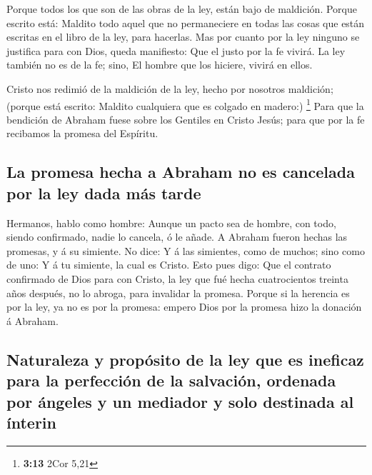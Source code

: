  Porque todos los que son de las obras de la ley, están
bajo de maldición. Porque escrito está: Maldito todo aquel que no
permaneciere en todas las cosas que están escritas en el libro de la
ley, para hacerlas.  Mas por cuanto por la ley ninguno se
justifica para con Dios, queda manifiesto: Que el justo por la fe
vivirá.  La ley también no es de la fe; sino, El hombre que
los hiciere, vivirá en ellos.

 Cristo nos redimió de la maldición de la ley, hecho por
nosotros maldición; (porque está escrito: Maldito cualquiera que es
colgado en madero:) \footnote{\textbf{3:13} 2Cor 5,21} 
Para que la bendición de Abraham fuese sobre los Gentiles en Cristo
Jesús; para que por la fe recibamos la promesa del Espíritu.

\hypertarget{la-promesa-hecha-a-abraham-no-es-cancelada-por-la-ley-dada-muxe1s-tarde}{%
\subsection{La promesa hecha a Abraham no es cancelada por la ley dada
más
tarde}\label{la-promesa-hecha-a-abraham-no-es-cancelada-por-la-ley-dada-muxe1s-tarde}}

 Hermanos, hablo como hombre: Aunque un pacto sea de
hombre, con todo, siendo confirmado, nadie lo cancela, ó le añade.
 A Abraham fueron hechas las promesas, y á su simiente. No
dice: Y á las simientes, como de muchos; sino como de uno: Y á tu
simiente, la cual es Cristo.  Esto pues digo: Que el
contrato confirmado de Dios para con Cristo, la ley que fué hecha
cuatrocientos treinta años después, no lo abroga, para invalidar la
promesa.  Porque si la herencia es por la ley, ya no es por
la promesa: empero Dios por la promesa hizo la donación á Abraham.

\hypertarget{naturaleza-y-propuxf3sito-de-la-ley-que-es-ineficaz-para-la-perfecciuxf3n-de-la-salvaciuxf3n-ordenada-por-uxe1ngeles-y-un-mediador-y-solo-destinada-al-uxednterin}{%
\subsection{Naturaleza y propósito de la ley que es ineficaz para la
perfección de la salvación, ordenada por ángeles y un mediador y solo
destinada al
ínterin}\label{naturaleza-y-propuxf3sito-de-la-ley-que-es-ineficaz-para-la-perfecciuxf3n-de-la-salvaciuxf3n-ordenada-por-uxe1ngeles-y-un-mediador-y-solo-destinada-al-uxednterin}}

